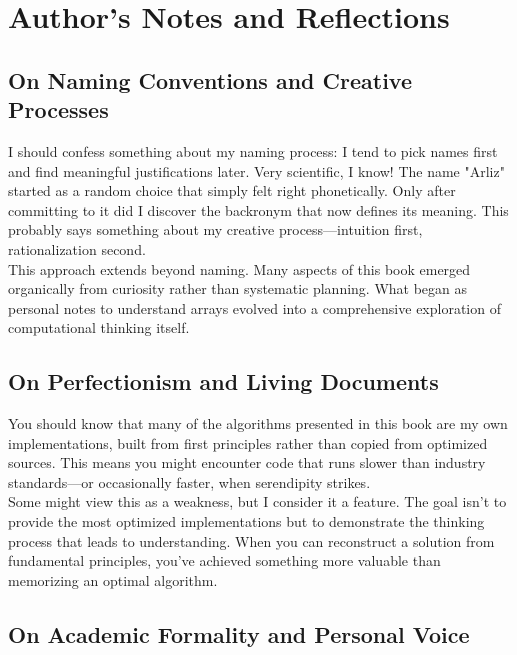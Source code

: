 \chapter*{Author's Notes and Reflections}

\section*{On Naming Conventions and Creative Processes}

I should confess something about my naming process: I tend to pick names first and find meaningful justifications later. Very scientific, I know! The name "Arliz" started as a random choice that simply felt right phonetically. Only after committing to it did I discover the backronym that now defines its meaning. This probably says something about my creative process—intuition first, rationalization second.\\

This approach extends beyond naming. Many aspects of this book emerged organically from curiosity rather than systematic planning. What began as personal notes to understand arrays evolved into a comprehensive exploration of computational thinking itself.\\

\section*{On Perfectionism and Living Documents}

You should know that many of the algorithms presented in this book are my own implementations, built from first principles rather than copied from optimized sources. This means you might encounter code that runs slower than industry standards—or occasionally faster, when serendipity strikes.\\

Some might view this as a weakness, but I consider it a feature. The goal isn't to provide the most optimized implementations but to demonstrate the thinking process that leads to understanding. When you can reconstruct a solution from fundamental principles, you've achieved something more valuable than memorizing an optimal algorithm.\\

\section*{On Academic Formality and Personal Voice}

